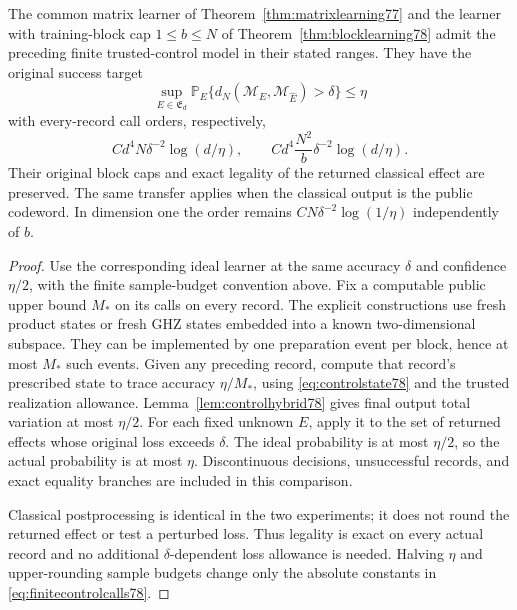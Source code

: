 \begin{theorem}
\label{thm:finitecontrollearning78}
The common matrix learner of Theorem~\ref{thm:matrixlearning77}
and the learner with training-block cap $1\le b\le N$ of
Theorem~\ref{thm:blocklearning78} admit the preceding finite
trusted-control model in their stated ranges.
They have the original success target
\[
 \sup_{E\in\mathfrak E_d}
 \mathbb P_E\{d_N(\mathcal M_E,\mathcal M_{\widehat E})>\delta\}
 \le\eta
\]
with every-record call orders, respectively,
\begin{equation}\label{eq:finitecontrolcalls78}
 Cd^4N\delta^{-2}\log(d/\eta),\qquad
 Cd^4\frac{N^2}{b}\delta^{-2}\log(d/\eta).
\end{equation}
Their original block caps and exact legality of the returned
classical effect are preserved.  The same transfer applies when the
classical output is the public codeword.
In dimension one the order remains
$CN\delta^{-2}\log(1/\eta)$ independently of $b$.
\end{theorem}
\begin{proof}
Use the corresponding ideal learner at the same accuracy $\delta$
and confidence $\eta/2$, with the finite sample-budget convention
above.  Fix a computable public upper bound $M_*$ on its calls
on every record.  The explicit constructions use fresh product
states or fresh GHZ states embedded into a known two-dimensional
subspace.  They can be implemented by one preparation event per
block, hence at most $M_*$ such events.  Given any preceding
record, compute that record's prescribed state to trace accuracy
$\eta/M_*$, using \eqref{eq:controlstate78} and the trusted
realization allowance.  Lemma~\ref{lem:controlhybrid78} gives final
output total variation at most $\eta/2$.  For each fixed unknown
$E$, apply it to the set of returned effects whose original loss
exceeds $\delta$.  The ideal probability is at most $\eta/2$,
so the actual probability is at most $\eta$.  Discontinuous
decisions, unsuccessful records, and exact equality branches are
included in this comparison.

Classical postprocessing is identical in the two experiments; it
does not round the returned effect or test a perturbed loss.
Thus legality is exact on every actual record and no additional
$\delta$-dependent loss allowance is needed.  Halving $\eta$ and
upper-rounding sample budgets change only the absolute constants
in \eqref{eq:finitecontrolcalls78}.
\end{proof}

